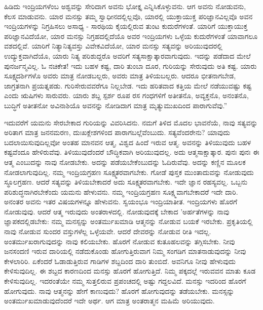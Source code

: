 ಹಿಡಿದು ಇಂದ್ರಿಯಗಳೆಂಬ ಅಶ್ವವನ್ನು ಸೇರಿದಾಗ ಅವನು ಭೋಕ್ತೃ ಎನ್ನಿಸಿಕೊಳ್ಳುವನು. ಆಗ ಅವನು ನೋಡುವನು, ಕೆಲಸ ಮಾಡುವನು. ಯಾರ ಮನಸ್ಸು ತಮ್ಮ ಸ್ವಾಧೀನದಲ್ಲಿಲ್ಲವೊ, ಯಾರಲ್ಲಿ ಯುಕ್ತಾಯುಕ್ತ ಪರಿಜ್ಞಾನವಿಲ್ಲವೊ ಅವನ ಇಂದ್ರಿಯಗಳನ್ನು ನಿಗ್ರಹಿಸಲು ಅಸಾಧ್ಯ - ಸಾರಥಿಯ ಕೈಯಲ್ಲಿರುವ ತುಂಟ ಕುದುರೆಗಳಂತೆ. ಯಾರಿಗೆ ಯುಕ್ತಾಯುಕ್ತ ಪರಿಜ್ಞಾನವಿದೆಯೋ, ಯಾರ ಮನಸ್ಸು ನಿಗ್ರಹದಲ್ಲಿದೆಯೊ ಅವರ ಇಂದ್ರಿಯಗಳು ಒಳ್ಳೆಯ ಕುದುರೆಗಳಂತೆ ಯಾವಾಗಲೂ ವಶದಲ್ಲಿವೆ. ಯಾರಿಗೆ ನಿತ್ಯಾನಿತ್ಯವಸ್ತು ವಿವೇಕವಿದೆಯೋ, ಯಾರ ಮನಸ್ಸು ಸತ್ಯವನ್ನು ಅರಿಯುವುದರಲ್ಲಿ ಉದ್ಯುಕ್ತವಾಗಿದೆಯೊ, ಯಾರು ನಿತ್ಯ ಪರಿಶುದ್ದರೊ ಅವರಿಗೆ ಸತ್ಯಸಾಕ್ಷಾತ್ಕಾರವಾಗುವುದು. ಇದನ್ನು ಪಡೆದಾದ ಮೇಲೆ ಪುನರ್ಜನ್ಮವಿಲ್ಲ. ಓ ನಚಿಕೇತ! ಇದು ಬಹಳ ಕಷ್ಟ, ದಾರಿ ತುಂಬಾ ದೂರ, ಗುರಿಯನ್ನು ಸೇರುವುದು ಅತಿ ಕಷ್ಟ. ಯಾರು ಸೂಕ್ಷ್ಮದರ್ಶಿಗಳೊ ಅವರು ಮಾತ್ರ ನೋಡಬಲ್ಲರು, ಅವರು ಮಾತ್ರ ತಿಳಿಯಬಲ್ಲರು. ಆದರೂ ಭೀತನಾಗಬೇಡ, ಜಾಗ್ರತನಾಗಿ ಪ್ರಯತ್ನಪಡು. ಗುರಿಸೇರುವವರೆಗೂ ನಿಲ್ಲಬೇಡ. ಇದು ಹರಿತವಾದ ಕತ್ತಿಯ ಮೇಲೆ ನಡೆಯುವಷ್ಟು ಕಷ್ಟ ಎಂದು ಋಷಿಗಳು ಸಾರುವರು. ಯಾರು ಶಬ್ದ ಸ್ಪರ್ಶ ರೂಪ ರಸ ಗಂಧಗಳಿಗೆ ಅತೀತನೊ, ಅವ್ಯಕ್ತನೊ, ಅನಂತನೊ, ಬುದ್ಧಿಗೆ ಅತೀತನೋ ಅವಿನಾಶಿಯೊ ಅವನನ್ನು ನೋಡಿದಾಗ ಮಾತ್ರ ಮೃತ್ಯುಮುಖದಿಂದ ಪಾರಾಗುವೆವು.”

ಇದುವರೆಗೆ ಯಮನು ಸೇರಬೇಕಾದ ಗುರಿಯನ್ನು ವಿವರಿಸಿದನು. ನಮಗೆ ತಿಳಿದ ಮೊದಲ ಭಾವನೆಯೆ, ನಾವು ಸತ್ಯವನ್ನು ಅರಿತಾಗ ಮಾತ್ರ ಜನನಮರಣ, ದುಃಖಕ್ಲೇಶಗಳಿಂದ ಪಾರಾಗಬಲ್ಲೆವೆಂಬುದು. ಸತ್ಯವೆಂದರೇನು? ಯಾವುದು ಬದಲಾಯಿಸುವುದಿಲ್ಲವೋ ಅಂತಹ ಮಾನವನ ಆತ್ಮ, ವಿಶ್ವದ ಹಿಂದೆ ಇರುವ ಆತ್ಮ. ಅವನನ್ನು ತಿಳಿಯುವುದು ಬಹಳ ಕಷ್ಟವೆಂದೂ ಹೇಳಿರುವೆವು. ತಿಳಿಯುವುದೆಂದರೆ ಬೌದ್ಧಿಕವಾಗಿ ಅರಿಯುವುದಲ್ಲ. ಅದು ಆತ್ಮಸಾಕ್ಷಾತ್ಕಾರ. ಪುನಃ ಪುನಃ ಈ ಆತ್ಮ ಎಂಬುದನ್ನು ನಾವು ನೋಡಬೇಕು. ಅದನ್ನು ಪಡೆಯಬೇಕೆಂಬುದನ್ನು ಓದಿರುವೆವು. ಅದನ್ನು ಕಣ್ಣಿನ ಮೂಲಕ ನೋಡಲಾಗುವುದಿಲ್ಲ. ನಮ್ಮ ಇಂದ್ರಿಯಗ್ರಹಣ ಸೂಕ್ಷ್ಮತರವಾಗಬೇಕು. ಗೋಡೆ ಪುಸ್ತಕ ಮುಂತಾದುವನ್ನು ನೋಡುವುದು ಸ್ಥೂಲಗ್ರಹಣ. ಆದರೆ ಸತ್ಯವನ್ನು ತಿಳಿಯಬೇಕಾದರೆ ಅದು ಸೂಕ್ಷ್ಮತರವಾಗಬೇಕು. ಇದೇ ಜ್ಞಾನ ರಹಸ್ಯವಲ್ಲ. ಒಬ್ಬನು ಪರಿಶುದ್ಧನಾಗಿರಬೇಕೆಂದು ಯಮನು ಹೇಳುವನು. ನಮ್ಮ ಇಂದ್ರಿಯಗ್ರಹಣ ಸೂಕ್ಷ್ಮವಾಗಬೇಕಾದರೆ ಇದೇ ದಾರಿ. ಅನಂತರ ಅವನು ಇತರ ವಿಷಯಗಳನ್ನೂ ಹೇಳುವನು. ಸ್ವಯಂಭೂ ಇಂದ್ರಿಯಾತೀತ. ಇಂದ್ರಿಯಗಳು ಹೊರಗೆ ನೋಡುವುವು. ಆದರೆ ಆತ್ಮ ಇರುವುದು ಅಂತರಾಳದಲ್ಲಿ. ನೋಡುವುದಕ್ಕೆ ಬೇಕಾದ 'ಅರ್ಹತೆಗಳನ್ನು ನಾವು ಜ್ಞಾಪಕದಲ್ಲಿಡಬೇಕು: ನಮ್ಮ ಮನಸ್ಸನ್ನು ಅಂತರ್ಮುಖಮಾಡಿ ಆತ್ಮನನ್ನು ನೋಡುವ ಬಯಕೆ ಇರಬೇಕು. ಪ್ರಕೃತಿಯಲ್ಲಿ ನಾವು ನೋಡುವ ಸುಂದರ ವಸ್ತುಗಳೆಲ್ಲ ಒಳ್ಳೆಯವೇ. ಆದರೆ ದೇವರನ್ನು ನೋಡುವ ರೀತಿ ಇದಲ್ಲ. ಅಂತರ್ಮುಖರಾಗುವುದನ್ನು ನಾವು ಕಲಿಯಬೇಕು. ಹೊರಗೆ ನೋಡುವ ಕುತೂಹಲವನ್ನು ತಗ್ಗಿಸಬೇಕು. ನೀವು ಜನಸಂದಣಿ ಇರುವ ದಾರಿಯಲ್ಲಿ ನಡೆದುಕೊಂಡು ಹೋಗುತ್ತಿರುವಾಗ ನಿಮ್ಮ ಸಂಗಡಿಗ ಮಾತನಾಡುವುದನ್ನು ನೀವು ಕೇಳಲಾರಿರಿ. ಏಕೆಂದರೆ ಓಡಾಡುತ್ತಿರುವ ಗಾಡಿಗಳ ಶಬ್ದದಿಂದ ದಾರಿ ತುಂಬಿದೆ. ಅವನಿಗೂ ನೀವು ಹೇಳುವುದು ಕೇಳಿಸುವುದಿಲ್ಲ. ಈ ಶಬ್ದದ ಕಾರಣದಿಂದ ಮನಸ್ಸು ಹೊರಗೆ ಹೋಗುತ್ತಿದೆ. ನಿಮ್ಮ ಪಕ್ಕದಲ್ಲೆ ಇರುವವನ ಮಾತು ಕೂಡ ಕೇಳಿಸುವುದಿಲ್ಲ. ಇದರಂತೆಯೇ ನಮ್ಮ ಸುತ್ತಲಿರುವ ಪ್ರಪಂಚದಲ್ಲಿ ಅಷ್ಟು ಗದ್ದಲವಿದೆ. ಮನಸ್ಸು ಇದರಿಂದ ಹೊರಗೆ ಹೋಗುವುದು. ನಾವು ಆತ್ಮನನ್ನು ಹೇಗೆ ಕಾಣುವುದು? ಹೊರಗೆ ಹೋಗುವುದನ್ನು ತಡೆಯಬೇಕು. ಮನಸ್ಸನ್ನು ಅಂತರ್ಮುಖಮಾಡುವುದೆಂದರೆ ಇದೇ ಅರ್ಥ. ಆಗ ಮಾತ್ರ ಅಂತರಾತ್ಮನ ಮಹಿಮೆ ಅರಿಯುವುದು.

